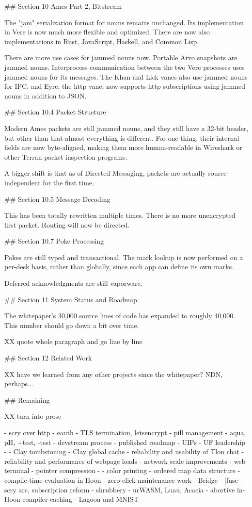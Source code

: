 \documentclass[twoside]{article}
\begin{document}
## Section 10 Ames Part 2, Bitstream

The "jam" serialization format for nouns remains unchanged.  Its implementation in Vere is now much more flexible and optimized.  There are now also implementations in Rust, JavaScript, Haskell, and Common Lisp.

There are more use cases for jammed nouns now.  Portable Arvo snapshots are jammed nouns.  Interprocess communication between the two Vere processes uses jammed nouns for its messages.  The Khan and Lick vanes also use jammed nouns for IPC, and Eyre, the {\sc http} vane, now supports {\sc http} subscriptions using jammed nouns in addition to JSON.

## Section 10.4 Packet Structure

Modern Ames packets are still jammed nouns, and they still have a 32-bit header, but other than that almost everything is different.  For one thing, their internal fields are now byte-aligned, making them more human-readable in Wireshark or other Terran packet inspection programs.

A bigger shift is that as of Directed Messaging, packets are actually source-independent for the first time.

## Section 10.5 Message Decoding

This has been totally rewritten multiple times.  There is no more unencrypted first packet.  Routing will now be directed.

## Section 10.7 Poke Processing

Pokes are still typed and transactional.  The mark lookup is now performed on a per-desk basis, rather than globally, since each app can define its own marks.

Deferred acknowledgments are still vaporware.

## Section 11 System Status and Roadmap

The whitepaper's 30,000 source lines of code has expanded to roughly 40,000.  This number should go down a bit over time.

XX quote whole paragraph and go line by line

## Section 12 Related Work

XX have we learned from any other projects since the whitepaper?  NDN, perhaps...

## Remaining

XX turn into prose

- scry over {\sc http}
- eauth
- TLS termination, letsencrypt
- pill management
- aqua, pH, +test, -test
- devstream process
- published roadmap
- UIPs
- UF leadership
- %
- Clay tombstoning
- Clay global cache
- reliability and usability of Tlon chat
- reliability and performance of webpage loads
- network scale improvements
- web terminal
- pointer compression
- %
- color printing
- ordered map data structure
- compile-time evaluation in Hoon
- zero-click maintenance work
- Bridge
- |fuse
- scry arc, subscription reform
- shrubbery
- urWASM, Luau, Acacia
- abortive in-Hoon compiler caching
- Lagoon and MNIST
\end{document}
